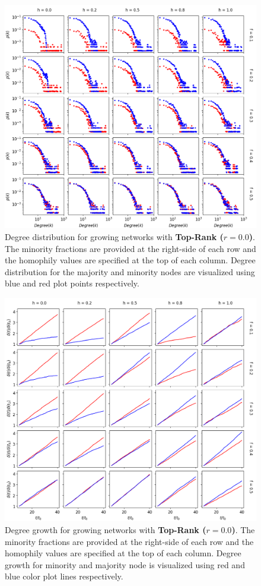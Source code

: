 \begin{appendices}
\begin{figure}[h!]
	\centering
	\includegraphics[width=1.0\textwidth]{images/dd_growth_top00.png}
	\caption{Degree distribution for growing networks with \textbf{Top-Rank ($r = 0.0$)}. The minority fractions are provided at the right-side of each row and the homophily values are specified at the top of each column. Degree distribution for the majority and minority nodes are visualized using blue and red plot points respectively.}
	\label{dd_growth_top00_fig}
\end{figure}

\begin{figure}[h!]
	\centering
	\includegraphics[width=1.0\textwidth]{images/dg_growth_top00.png}
	\caption{Degree growth for growing networks with \textbf{Top-Rank ($r = 0.0$)}. The minority fractions are provided at the right-side of each row and the homophily values are specified at the top of each column. Degree growth for minority and majority node is visualized using red and blue color plot lines respectively.}
	\label{dg_growth_top00_fig}
\end{figure}


\end{appendices}
